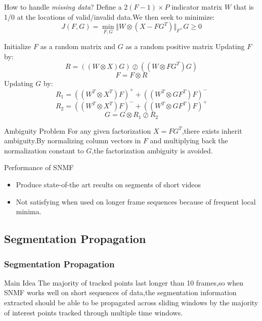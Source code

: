 \documentclass{beamer}
\begin{document}
\begin{frame}[allowframebreaks]
\begin{block}{How to handle \emph{missing data}?}
Define a $2(F-1)\times P$ indicator matrix $W$ that is 1/0 at the locations of valid/invalid data.We then seek to minimize:
\begin{equation}
J(F,G)=\min_{F,G}\Vert W\otimes(X-FG^T)\Vert_F,G\geq 0
\end{equation}
\end{block}

\begin{algorithm}[H]
\caption{SNMF with missing data}
Initialize $F$ as a random matrix and $G$ as a random positive matrix\;
{
Updating $F$ by:\begin{equation}R=((W\otimes X)G)\oslash((W\otimes FG^T)G)\end{equation} \begin{equation}F=F\otimes R\end{equation}
Updating $G$ by:\begin{equation}R_1=((W^T\otimes X^T)F)^+ +((W^T\otimes GF^T)F)^-\end{equation} \begin{equation}R_2=((W^T\otimes X^T)F)^- +((W^T\otimes GF^T)F)^+\end{equation} \begin{equation} G=G\otimes R_1\oslash R_2 \end{equation}
}
\end{algorithm}

\begin{block}{Ambiguity Problem}
For any given factorization $X=FG^T$,there exists inherit ambiguity.By normalizing column vectors in $F$ and multiplying back the normalization constant to $G$,the factorization ambiguity is avoided.
\end{block}

\begin{block}{Performance of SNMF}
\begin{itemize}
\item Produce state-of-the art results on segments of short videos
\item Not satisfying when used on longer frame sequences because of frequent local minima.
\end{itemize}
\end{block}
\end{frame}


\subsection{Segmentation Propagation}
\begin{frame}[allowframebreaks]\frametitle{Segmentation Propagation}
\begin{block}{Main Idea}
The majority of tracked points last longer than 10 frames,so when SNMF works well on short sequences of data,the segmentation information extracted should be able to be propagated across sliding windows by the majority of interest points tracked through multiple time windows.
\end{block}
\end{frame}
\end{document}
